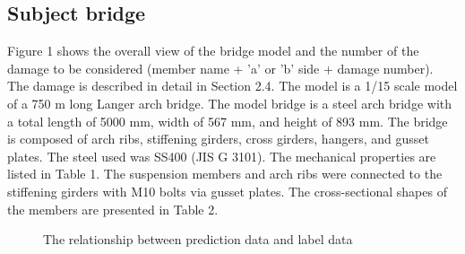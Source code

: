 \documentclass{proc-a4}
\begin{document}
\subsection{Subject bridge}
Figure 1 shows the overall view of the bridge model and the number of the damage to be considered (member name + 'a' or 'b' side + damage number). The damage is described in detail in Section 2.4. The model is a 1/15 scale model of a 750 m long Langer arch bridge. The model bridge is a steel arch bridge with a total length of 5000 mm, width of 567 mm, and height of 893 mm. The bridge is composed of arch ribs, stiffening girders, cross girders, hangers, and gusset plates. The steel used was SS400 (JIS G 3101). The mechanical properties are listed in Table 1. The suspension members and arch ribs were connected to the stiffening girders with M10 bolts via gusset plates. The cross-sectional shapes of the members are presented in Table 2. 
  \begin{figure}
\centering
{}
    \caption{The relationship between prediction data and label data}
    \label{fig-predicdata}
\end{figure}
\begin{table}[ht]
\end{table}
\end{document}
